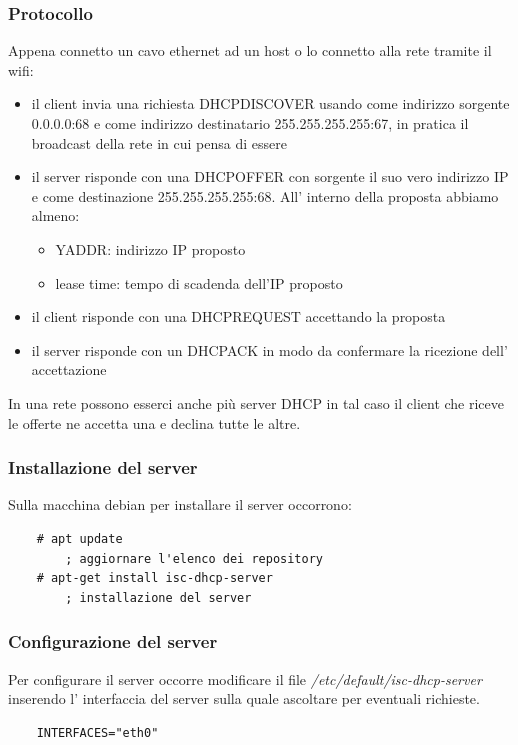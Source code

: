 \subsubsection{Protocollo}
Appena connetto un cavo ethernet ad un host o lo connetto alla rete tramite il wifi:
\begin{itemize}
    \item il client invia una richiesta DHCPDISCOVER usando come indirizzo sorgente 0.0.0.0:68 e come indirizzo destinatario 255.255.255.255:67, in pratica il broadcast della rete in cui pensa di essere
    
    \item il server risponde con una DHCPOFFER con sorgente il suo vero indirizzo IP e come destinazione 255.255.255.255:68. All' interno della proposta abbiamo almeno:
    \begin{itemize}
        \item YADDR: indirizzo IP proposto
        \item lease time: tempo di scadenda dell'IP proposto
    \end{itemize}
    
    \item il client risponde con una DHCPREQUEST accettando la proposta
    
    \item il server risponde con un DHCPACK in modo da confermare la ricezione dell' accettazione
\end{itemize}
In una rete possono esserci anche più server DHCP in tal caso il client che riceve le offerte ne accetta una e declina tutte le altre.

\subsubsection{Installazione del server}
Sulla macchina debian per installare il server occorrono:
\begin{verbatim}
    # apt update
        ; aggiornare l'elenco dei repository
    # apt-get install isc-dhcp-server
        ; installazione del server
\end{verbatim}

\subsubsection{Configurazione del server}
Per configurare il server occorre modificare il file \emph{/etc/default/isc-dhcp-server} inserendo l' interfaccia del server sulla quale ascoltare per eventuali richieste.
\begin{verbatim}
    INTERFACES="eth0"
\end{verbatim}

